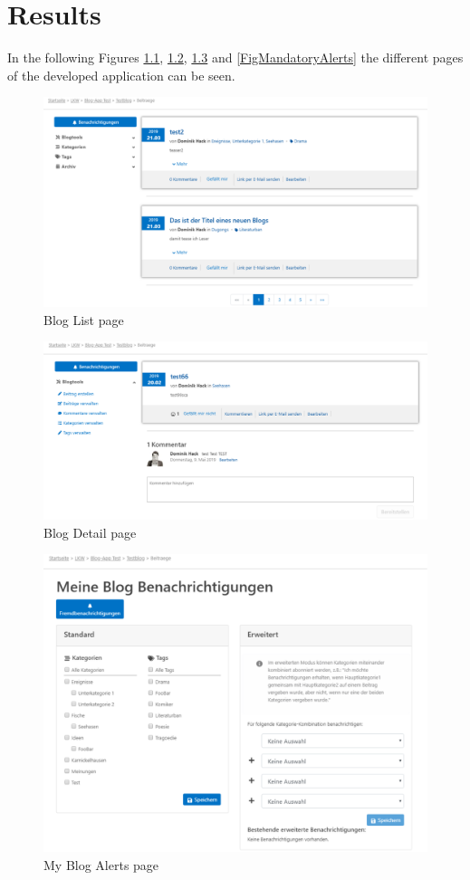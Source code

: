 \documentclass[Bachelor,BIF,english]{twbook}
\begin{document}
\clearpage

\chapter{Results}
In the following Figures \ref{FigBlogList}, \ref{FigBlogDetail}, \ref{FigMyAlerts} and \ref{FigMandatoryAlerts} the different pages of the developed application can be seen.
\begin{figure}[!htbp]
\centering
\includegraphics[width=1\linewidth]{PICs/blog_list_page.eps}
\caption{Blog List page}\label{FigBlogList}
\end{figure}
\begin{figure}[!htbp]
\centering
\includegraphics[width=1\linewidth]{PICs/blog_detail_page.eps}
\caption{Blog Detail page}\label{FigBlogDetail}
\end{figure}
\begin{figure}[!htbp]
\centering
\includegraphics[width=1\linewidth]{PICs/my_blog_alerts_page.eps}
\caption{My Blog Alerts page}\label{FigMyAlerts}
\end{figure}
\end{document}
